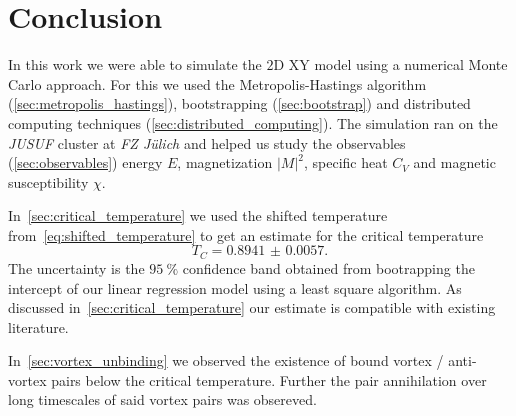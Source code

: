 \section{Conclusion}
In this work we were able to simulate the $2$D XY model using a numerical Monte Carlo approach. For this we used the Metropolis-Hastings algorithm (\cref{sec:metropolis_hastings}), bootstrapping (\cref{sec:bootstrap}) and distributed computing techniques (\cref{sec:distributed_computing}). The simulation ran on the \emph{JUSUF} cluster at \emph{FZ Jülich} and helped us study the observables (\cref{sec:observables}) energy $E$, magnetization ${\lvert M \rvert}^2$, specific heat $C_V$ and magnetic susceptibility $\chi$.

In~\cref{sec:critical_temperature} we used the shifted temperature  from~\cref{eq:shifted_temperature} to get an estimate for the critical temperature
\begin{equation}
	T_C = \num{0.8941(57)}.
\end{equation}
The uncertainty is the $\SI{95}{\percent}$ confidence band obtained from bootrapping the intercept of our linear regression model using a least square algorithm. As discussed in~\cref{sec:critical_temperature} our estimate is compatible with existing literature.

In~\cref{sec:vortex_unbinding} we observed the existence of bound vortex / anti-vortex pairs below the critical temperature. Further the pair annihilation over long timescales of said vortex pairs was obsereved.